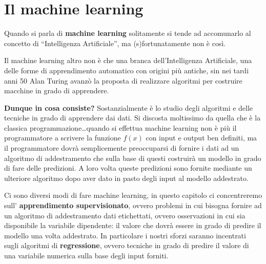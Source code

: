 \documentclass[a4paper, 11pt, oneside]{report}
\begin{document}
    \chapter{Il machine learning}
        Quando si parla di \textbf{machine learning} solitamente si tende ad accomunarlo al concetto di ``Intelligenza Artificiale'',
        ma (s)fortunatamente non è così.
        \par \noindent Il machine learning altro non è che una branca dell'Intelligenza Artificiale, una delle forme
        di apprendimento automatico con origini più antiche, sin nei tardi anni 50 Alan Turing avanzò la proposta
        di realizzare algoritmi per costruire macchine in grado di apprendere.
        \par \noindent \textbf{Dunque in cosa consiste?} Sostanzialmente è lo studio degli algoritmi e delle tecniche in
        grado di apprendere dai dati.
        Si discosta moltissimo da quella che è la classica programmazione\ldots quando si effettua machine learning non
        è più il programmatore a scrivere la funzione $f(x)$ con input e output ben definiti, ma il
        programmatore dovrà semplicemente preoccuparsi di fornire i dati ad un algoritmo di addestramento che sulla base
        di questi costruirà un modello in grado di fare delle predizioni. A loro volta queste predizioni sono fornite
        mediante un ulteriore algoritmo dopo aver dato in pasto degli input al modello addestrato.
        \\
        \par \noindent Ci sono diversi modi di fare machine learning, in questo capitolo ci concentreremo sull'
        \textbf{apprendimento supervisionato}, ovvero problemi in cui bisogna fornire ad un algoritmo di addestramento
        dati etichettati, ovvero osservazioni in cui sia disponibile la variabile dipendente: il valore che
        dovrà essere in grado di predire il modello una volta addestrato.
        In particolare i nostri sforzi saranno incentrati sugli algoritmi di \textbf{regressione}, ovvero tecniche in grado
        di predire il valore di una variabile numerica sulla base degli input forniti.
\end{document}
